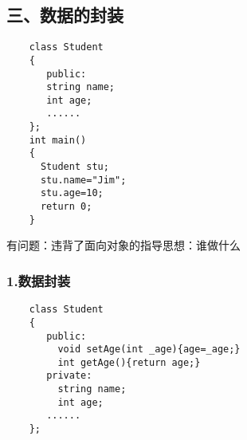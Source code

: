 \documentclass{article}
\begin{document}
\begin{CJK}{UTF8}{gbsn}
\part*{三、数据的封装}
\begin{verbatim}
    class Student
    {
       public:
       string name;
       int age;
       ......
    };
    int main()
    {
      Student stu;
      stu.name="Jim";
      stu.age=10;
      return 0;
    }
\end{verbatim}
\subparagraph*{}
有问题：违背了面向对象的指导思想：谁做什么
\section*{1.数据封装}
\begin{verbatim}
    class Student
    {
       public:
         void setAge(int _age){age=_age;}
         int getAge(){return age;}
       private:
         string name;
         int age;
       ......
    };
\end{verbatim}

\end{CJK}
\end{document}
